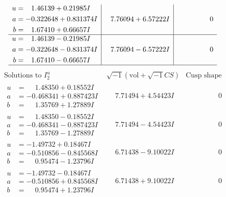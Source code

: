 \documentclass[1p]{elsarticle_modified}
\theoremstyle{definition}
\newcommand{\I}{\sqrt{-1}}
\begin{document}
$$\begin{array}{c|c|c}
\begin{aligned}
u &= \phantom{-}1.46139 + 0.21985 I \\
a &= -0.322648 + 0.831374 I \\
b &= \phantom{-}1.67410 + 0.66657 I\end{aligned}
 & \phantom{-}7.76094 + 6.57222 I & \phantom{-0.000000 } 0 \\ \hline\begin{aligned}
u &= \phantom{-}1.46139 - 0.21985 I \\
a &= -0.322648 - 0.831374 I \\
b &= \phantom{-}1.67410 - 0.66657 I\end{aligned}
 & \phantom{-}7.76094 - 6.57222 I & \phantom{-0.000000 } 0\\
 \hline 
 \end{array}$$\newpage$$\begin{array}{c|c|c}  
\text{Solutions to }I^u_{2}& \I (\text{vol} + \sqrt{-1}CS) & \text{Cusp shape}\\
 \hline 
\begin{aligned}
u &= \phantom{-}1.48350 + 0.18552 I \\
a &= -0.468341 + 0.887423 I \\
b &= \phantom{-}1.35769 + 1.27889 I\end{aligned}
 & \phantom{-}7.71494 + 4.54423 I & \phantom{-0.000000 } 0 \\ \hline\begin{aligned}
u &= \phantom{-}1.48350 - 0.18552 I \\
a &= -0.468341 - 0.887423 I \\
b &= \phantom{-}1.35769 - 1.27889 I\end{aligned}
 & \phantom{-}7.71494 - 4.54423 I & \phantom{-0.000000 } 0 \\ \hline\begin{aligned}
u &= -1.49732 + 0.18467 I \\
a &= -0.510856 - 0.845568 I \\
b &= \phantom{-}0.95474 - 1.23796 I\end{aligned}
 & \phantom{-}6.71438 - 9.10022 I & \phantom{-0.000000 } 0 \\ \hline\begin{aligned}
u &= -1.49732 - 0.18467 I \\
a &= -0.510856 + 0.845568 I \\
b &= \phantom{-}0.95474 + 1.23796 I\end{aligned}
 & \phantom{-}6.71438 + 9.10022 I & \phantom{-0.000000 } 0 \\ \hline\begin{aligned}

\end{aligned}
\end{array}$$
\end{document}
